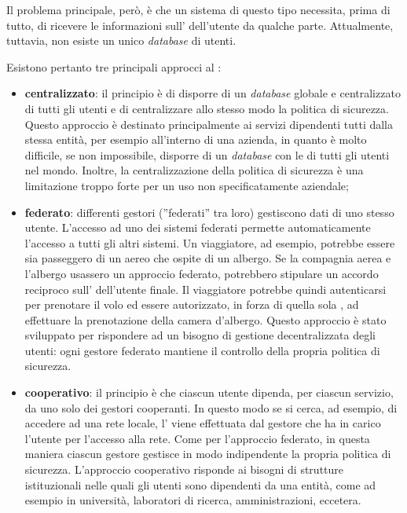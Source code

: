 Il problema principale, però, è che un sistema di questo tipo necessita, prima di tutto, di ricevere le informazioni sull' dell'utente da qualche parte. Attualmente, tuttavia, non esiste un unico \textit{database} di utenti.


Esistono pertanto tre principali approcci al :
\begin{itemize}
\item \textbf{centralizzato}: il principio è di disporre di un \textit{database} globale e centralizzato di tutti gli utenti e di centralizzare allo stesso modo la politica di sicurezza. Questo approccio è destinato principalmente ai servizi dipendenti tutti dalla stessa entità, per esempio all'interno di una azienda, in quanto è molto difficile, se non impossibile, disporre di un \textit{database} con le  di tutti gli utenti nel mondo. Inoltre, la centralizzazione della politica di sicurezza è una limitazione troppo forte per un uso non specificatamente aziendale;
\item \textbf{federato}: differenti gestori (''federati'' tra loro) gestiscono dati di uno stesso utente. L'accesso ad uno dei sistemi federati permette automaticamente l'accesso a tutti gli altri sistemi. Un viaggiatore, ad esempio, potrebbe essere sia passeggero di un aereo che ospite di un albergo. Se la compagnia aerea e l'albergo usassero un approccio federato, potrebbero stipulare un accordo reciproco sull' dell'utente finale. Il viaggiatore potrebbe quindi autenticarsi per prenotare il volo ed essere autorizzato, in forza di quella sola , ad effettuare la prenotazione della camera d'albergo. Questo approccio è stato sviluppato per rispondere ad un bisogno di gestione decentralizzata degli utenti: ogni gestore federato mantiene il controllo della propria politica di sicurezza.
\item \textbf{cooperativo}: il principio è che ciascun utente dipenda, per ciascun servizio, da uno solo dei gestori cooperanti. In questo modo se si cerca, ad esempio, di accedere ad una rete locale, l' viene effettuata dal gestore che ha in carico l'utente per l'accesso alla rete. Come per l'approccio federato, in questa maniera ciascun gestore gestisce in modo indipendente la propria politica di sicurezza. L'approccio cooperativo risponde ai bisogni di strutture istituzionali nelle quali gli utenti sono dipendenti da una entità, come ad esempio in università, laboratori di ricerca, amministrazioni, eccetera.
\end{itemize}


